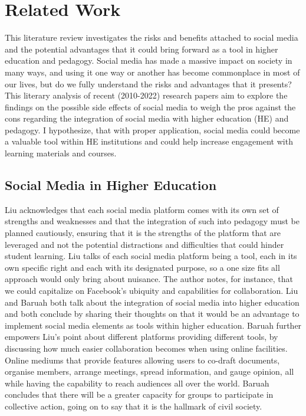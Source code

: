 \documentclass[lettersize,journal]{IEEEtran}
\begin{document}
\section{Related Work}
    This literature review investigates the risks and benefits attached to
    social media and the potential advantages that it could bring forward as a
    tool in higher education and pedagogy. Social media has made a massive
    impact on society in many ways, and using it one way or another has become
    commonplace in most of our lives, but do we fully understand the risks and
    advantages that it presents? This literary analysis of recent (2010-2022)
    research papers aim to explore the findings on the possible side effects of
    social media to weigh the pros against the cons regarding
    the integration of social media with higher education (HE) and pedagogy. I
    hypothesize, that with proper application, social media could become a valuable
    tool within HE institutions and could help increase engagement with learning
    materials and courses.

\subsection{Social Media in Higher Education}
    Liu \cite{Liu2010} acknowledges that each social media platform comes with
    its own set of strengths and weaknesses and that the integration of such into
    pedagogy must be planned cautiously, ensuring that it is the strengths of the platform
    that are leveraged and not the potential distractions and difficulties that could
    hinder student learning. Liu talks of each social media platform being a tool,
    each in its own specific right and each with its designated purpose, so a one size
    fits all approach would only bring about nuisance. The author notes, for instance,
    that we could capitalize on Facebook's ubiquity and capabilities for collaboration.
    Liu \cite{Liu2010} and Baruah \cite{Baruah2012} both talk about the integration of
    social media into higher education and both conclude by sharing their thoughts on that
    it would be an advantage to implement social media elements as tools within higher
    education. Baruah further empowers Liu's point about different platforms providing
    different tools, by discussing how much easier collaboration becomes when using
    online facilities. Online mediums that provide features allowing users to co-draft
    documents, organise members, arrange meetings, spread information, and gauge opinion,
    all while having the capability to reach audiences all over the world.
    Baruah concludes that there will be a greater capacity for groups to participate in
    collective action, going on to say that it is the hallmark of civil society.
\end{document}
